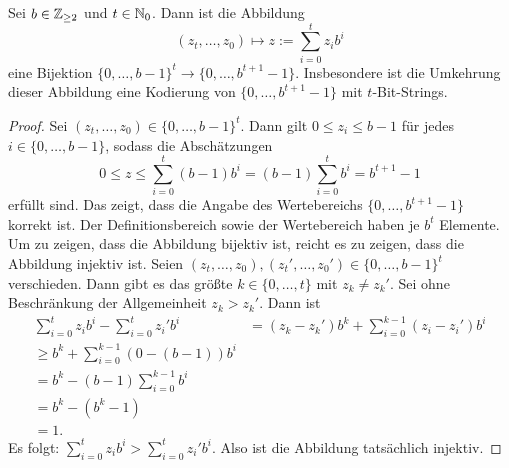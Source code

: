\begin{prop}
	Sei $b \in \mathbb{Z}_{\ge 2}$ und $t \in \mathbb{N}_0$. Dann ist die Abbildung 
	\begin{equation}
	(z_t,\ldots,z_0) \mapsto z:= \sum_{i=0}^t z_i b^i
	\end{equation}
	eine Bijektion $\{0,\ldots,b-1\}^t \to \{0,\ldots,b^{t+1} -1\}$. Insbesondere ist die Umkehrung dieser Abbildung eine Kodierung von $\{0,\ldots,b^{t+1} -1\}$ mit $t$-Bit-Strings. 
\end{prop} 
\begin{proof}
 Sei $(z_t,\ldots,z_0) \in \{0,\ldots,b-1\}^t$. Dann gilt $0 \le z_i  \le b-1$ für jedes $i  \in \{0,\ldots,b-1\}$, sodass die Abschätzungen
 \[
 	0 \le z \le \sum_{i=0}^t (b-1) b^i = (b-1) \sum_{i=0}^t b^i = b^{t+1} -1
 \]
 erfüllt sind. Das zeigt, dass die Angabe des Wertebereichs $\{0,\ldots,b^{t+1} -1\}$ korrekt ist.
 Der Definitionsbereich sowie der Wertebereich haben je $b^t$ Elemente. Um zu zeigen, dass die Abbildung bijektiv ist, reicht es zu zeigen, dass die Abbildung injektiv ist. Seien $(z_t,\ldots,z_0), (z_t',\ldots,z_0') \in \{0,\ldots,b-1\}^t$ verschieden. Dann gibt es das größte $k\in \{0,\ldots,t\}$ mit $z_k \ne z_k'$. Sei ohne Beschränkung der Allgemeinheit $z_k>z_k'$. Dann ist 
 \begin{align*}
 		\sum_{i=0}^t z_i b^i - \sum_{i=0}^t z_i' b^i & = (z_k - z_k')b^k + \sum_{i=0}^{k-1} (z_i -z_i') b^i
 		\\ \ge b^k + \sum_{i=0}^{k-1} (0 - (b-1)) b^i 
 		\\ = b^k - (b-1) \sum_{i=0}^{k-1} b^i
 		\\ = b^k - (b^k - 1) 
 		\\ =1.
 \end{align*}
Es folgt: $\sum_{i=0}^t z_i b^i > \sum_{i=0}^t z_i' b^i $. Also ist die Abbildung tatsächlich injektiv. 
\end{proof} 

